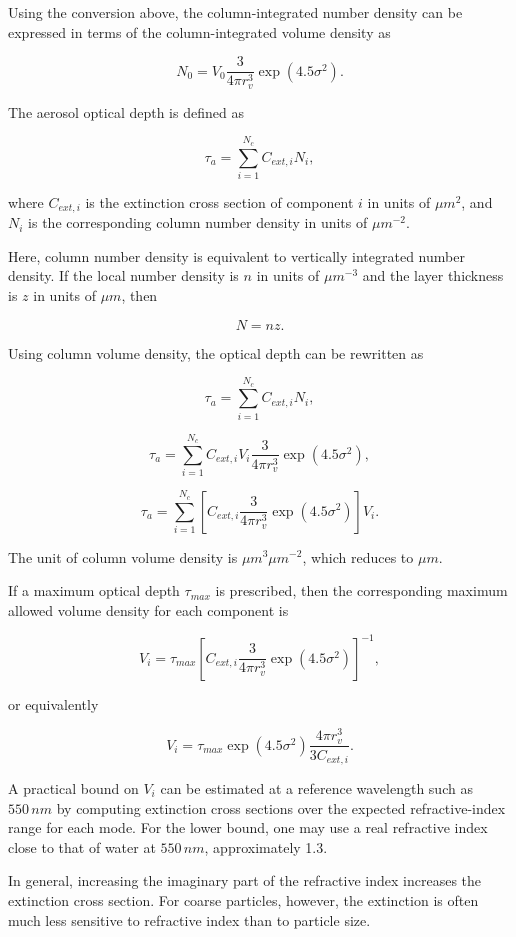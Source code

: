 \documentclass[
  letterpaper,
]{scrbook}
\begin{document}
Using the conversion above, the column-integrated number density can be
expressed in terms of the column-integrated volume density as

\[
N_{0}=V_{0} \frac{3}{4 \pi r_{v}^3}\exp(4.5 \sigma^2).
\]

The aerosol optical depth is defined as

\[
\tau_a=\sum_{i=1}^{N_c} C_{ext,i} N_i,
\]

where \(C_{ext,i}\) is the extinction cross section of component \(i\)
in units of \(\mu m^2\), and \(N_i\) is the corresponding column number
density in units of \(\mu m^{-2}\).

Here, column number density is equivalent to vertically integrated
number density. If the local number density is \(n\) in units of
\(\mu m^{-3}\) and the layer thickness is \(z\) in units of \(\mu m\),
then

\[
N = n z.
\]

Using column volume density, the optical depth can be rewritten as

\[
\tau_a = \sum_{i=1}^{N_c} C_{ext,i} N_i,
\]

\[
\tau_a = \sum_{i=1}^{N_c} C_{ext,i} V_i \frac{3}{4 \pi r_{v}^3}\exp(4.5 \sigma^2),
\]

\[
\tau_a = \sum_{i=1}^{N_c} \left[C_{ext,i} \frac{3}{4 \pi r_{v}^3}\exp(4.5 \sigma^2)\right] V_i.
\]

The unit of column volume density is \(\mu m^3 \mu m^{-2}\), which
reduces to \(\mu m\).

If a maximum optical depth \(\tau_{max}\) is prescribed, then the
corresponding maximum allowed volume density for each component is

\[
V_i=\tau_{max}\left[C_{ext,i} \frac{3}{4 \pi r_{v}^3}\exp(4.5 \sigma^2)\right]^{-1},
\]

or equivalently

\[
V_i=\tau_{max} \exp(4.5 \sigma^2) \frac{4 \pi r_{v}^3}{3 C_{ext,i}}.
\]

A practical bound on \(V_i\) can be estimated at a reference wavelength
such as \(550 \, nm\) by computing extinction cross sections over the
expected refractive-index range for each mode. For the lower bound, one
may use a real refractive index close to that of water at \(550 \, nm\),
approximately 1.3.

In general, increasing the imaginary part of the refractive index
increases the extinction cross section. For coarse particles, however,
the extinction is often much less sensitive to refractive index than to
particle size.
\end{document}
